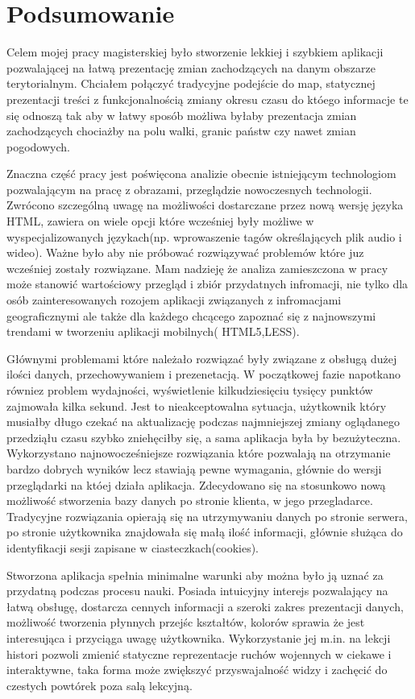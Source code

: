 \chapter{Podsumowanie}

Celem mojej pracy magisterskiej było stworzenie lekkiej i szybkiem aplikacji pozwalającej na łatwą prezentację zmian zachodzących na danym obszarze terytorialnym. Chciałem połączyć tradycyjne podejście do map, statycznej prezentacji treści z funkcjonalnością zmiany okresu czasu do któego informacje te się odnoszą tak aby w łatwy sposób możliwa byłaby prezentacja zmian zachodzących chociażby na polu walki, granic państw czy nawet zmian pogodowych.

Znaczna część pracy jest poświęcona analizie obecnie istniejącym technologiom pozwalającym na pracę z obrazami, przeglądzie nowoczesnych technologii. Zwrócono szczególną uwagę na możliwości dostarczane przez nową wersję języka HTML, zawiera on wiele opcji które wcześniej były możliwe w wyspecjalizowanych językach(np. wprowaszenie tagów określających plik audio i wideo). Ważne było aby nie próbować rozwiązywać problemów które juz wcześniej zostały rozwiązane. Mam nadzieję że analiza zamieszczona w pracy może stanowić wartościowy przegląd i zbiór przydatnych infromacji, nie tylko dla osób zainteresowanych rozojem aplikacji związanych z infromacjami geograficznymi ale także dla każdego chcącego zapoznać się z najnowszymi trendami w tworzeniu aplikacji mobilnych( HTML5,LESS).

Głównymi problemami które należało rozwiązać były związane z obsługą dużej ilości danych, przechowywaniem i prezenetacją. W początkowej fazie napotkano równiez problem wydajności, wyświetlenie kilkudziesięciu tysięcy punktów zajmowała kilka sekund. Jest to nieakceptowalna sytuacja, użytkownik który musiałby długo czekać na aktualizację podczas najmniejszej zmiany oglądanego przedziąłu czasu szybko zniehęciłby się, a sama aplikacja była by bezużyteczna. Wykorzystano najnowocześniejsze rozwiązania które pozwalają na otrzymanie bardzo dobrych wyników lecz stawiają pewne wymagania, głównie do wersji przeglądarki na któej działa aplikacja. Zdecydowano się na stosunkowo nową możliwość stworzenia bazy danych po stronie klienta, w jego przegladarce. Tradycyjne rozwiązania opierają się na utrzymywaniu danych po stronie serwera, po stronie użytkownika znajdowała się małą ilość informacji, głównie służąca do identyfikacji sesji zapisane w ciasteczkach(cookies).

Stworzona aplikacja spełnia minimalne warunki aby można było ją uznać za przydatną podczas procesu nauki. Posiada intuicyjny interejs pozwalający na łatwą obsługę, dostarcza cennych informacji a szeroki zakres prezentacji danych, możliwość tworzenia płynnych przejśc kształtów, kolorów sprawia że jest interesująca i przyciąga uwagę użytkownika. Wykorzystanie jej m.in. na lekcji histori pozwoli zmienić statyczne reprezentacje ruchów wojennych w ciekawe i interaktywne, taka forma może zwiększyć przyswajalność widzy i zachęcić do czestych powtórek poza salą lekcyjną. 
